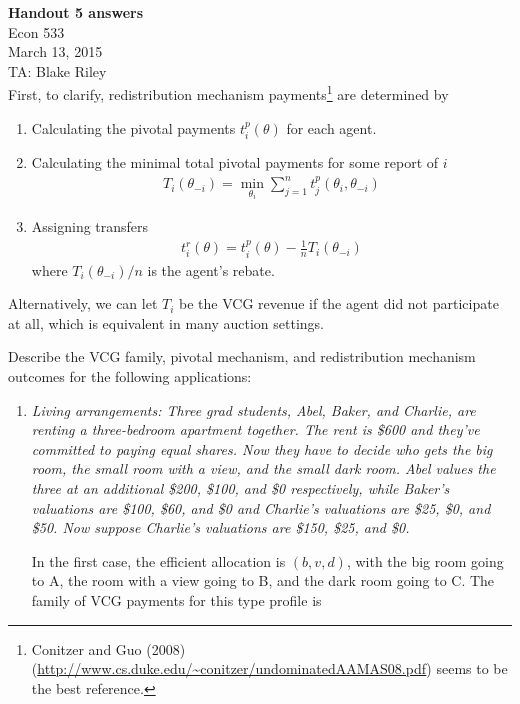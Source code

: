 \documentclass[letter, 10pt]{article}
\theoremstyle{basic}
\newcommand{\noti}{{{\scriptscriptstyle-}\!i}}
\begin{document}
\begin{spacing}{1.0}

\noindent
\textbf{Handout 5 answers} \\
Econ 533 \\
March 13, 2015 \\
TA: Blake Riley \\

\noindent
First, to clarify, redistribution mechanism payments\footnote{Conitzer and
  Guo (2008)
  (\url{http://www.cs.duke.edu/~conitzer/undominatedAAMAS08.pdf}) seems to
  be the best reference.} are determined by
  \begin{enumerate}
  \item Calculating the pivotal payments $t_i^p(\theta)$ for each agent.
  \item Calculating the minimal total pivotal payments for some report of
    $i$
    \begin{align*}
      T_i(\theta_\noti) = \min_{\theta_i} \sum_{j=1}^n t_j^p(\theta_i, \theta_\noti)
    \end{align*}
  \item Assigning transfers
    \begin{align*}
      t_i^r(\theta) = t_i^p(\theta) - \frac{1}{n} T_i(\theta_\noti)
    \end{align*}
    where $T_i(\theta_\noti)/n$ is the agent's rebate.
  \end{enumerate}
  Alternatively, we can let $T_i$ be the VCG revenue if the agent did not
  participate at all, which is equivalent in many auction settings.

\vspace{1em}
\noindent
  Describe the VCG family, pivotal mechanism, and redistribution mechanism
outcomes for the following applications:
  \begin{enumerate}
  \item \textit{Living arrangements: Three grad students, Abel, Baker, and
      Charlie, are renting a three-bedroom apartment together. The rent is
      \$600 and they've committed to paying equal shares. Now they have to
      decide who gets the big room, the small room with a view, and the
      small dark room. Abel values the three at an additional \$200,
      \$100, and \$0 respectively, while Baker's valuations are \$100,
      \$60, and \$0 and Charlie's valuations are \$25, \$0, and \$50. Now
      suppose Charlie's valuations are \$150, \$25, and \$0.}

  In the first case, the efficient allocation is $(b, v, d)$, with the big
  room going to A, the room with a view going to B, and the dark room
  going to C. The family of VCG payments for this type profile is


\end{enumerate}
\end{spacing}
\end{document}
